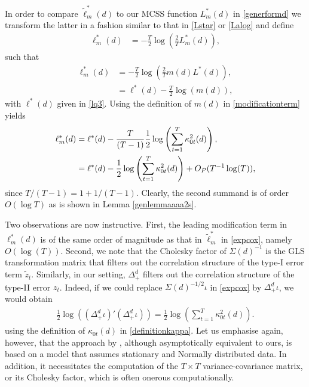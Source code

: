 {{In order to compare $\tilde{\ell}^*_m (d)$ to our MCSS function $L_m^*(d)$ in \eqref{generformd} we transform the latter in a fashion similar to that in \eqref{Lstar} or \eqref{Lalog} and define
\begin{align*}
     \ell^*_{m}(d) &= -\frac{T}{2} \log\left( \frac{2}{T}  L_{m}^*(d)  \right),
\end{align*}
such that
\begin{align*}
     \ell^*_{m}(d)  &= -\frac{T}{2} \log\left( \frac{2}{T}  m(d) L^*(d)  \right), \\
                 &=  \ell^*(d)-\frac{T}{2} \log\left(  m(d)  \right), 
\end{align*}
with $\ell^* (d)$ given in \eqref{lq3}. Using the definition of $m(d)$ in \eqref{modificationterm} yields
\begin{align}
     \ell^*_{m}(d)  &=  \ell^*(d)-\frac{T}{(T-1)} \frac{1}{2} \log\left(  \sum_{t = 1}^T \kappa^2_{0t}(d)   \right), \notag \\
                 &= \ell^*(d)-\frac{1}{2} \log\left(  \sum_{t = 1}^T \kappa^2_{0t}(d)   \right) + O_P(T^{-1}\log(T)), \label{modlogterm}
\end{align}
since $T/(T-1) = 1 + 1/(T-1)$. Clearly, the second summand is of order $O (\log T)$ as is shown in Lemma \ref{genlemmaaaa2s}.

Two observations are now instructive. First, the leading modification term in $\ell^*_m (d)$ is of the same order of magnitude as that in $\tilde \ell^*_m$ in \eqref{expcox}, namely $O(\log(T))$. Second, we note that the Cholesky factor of $\Sigma(d)^{-1}$ is
the GLS transformation matrix that filters out the correlation structure of the type-I error term $\tilde z_t$. Similarly, in our setting, $\Delta_{+}^{d}$ filters out the correlation structure of the type-II error
$z_t$. Indeed, if we could replace $\Sigma(d)^{-1/2} \iota$ in \eqref{expcox} by $\Delta_{+}^{d} \iota$, we would obtain
\begin{align*}
  \frac{1}{2} \log \left( (\Delta_{+}^{d} \iota )' (\Delta_{+}^{d} \iota) \right) = \frac{1}{2} \log \left( \sum_{t = 1}^T \kappa^2_{0t}(d)   \right) .
\end{align*}
using the definition of $\kappa_{0t}(d)$ in \eqref{definitionkappa}.
Let us emphasise again, however, that the approach by \textcite{an1993cox}, although asymptotically equivalent to ours, is based on a model that assumes stationary and Normally distributed data. In addition, it
necessitates the computation of the $T \times T$ variance-covariance matrix, or its Cholesky factor, which is often onerous computationally.


}}
